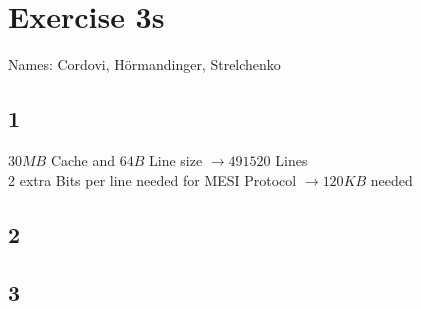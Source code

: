 \documentclass{article}
\begin{document}
\section*{Exercise 3s}
Names: Cordovi, H\"ormandinger, Strelchenko

\subsection*{1} %
$30MB$ Cache and $64B$ Line size $\rightarrow 491520$ Lines\\
2 extra Bits per line needed for MESI Protocol $\rightarrow 120 KB$ needed

\subsection*{2}



\subsection*{3}
\end{document}
